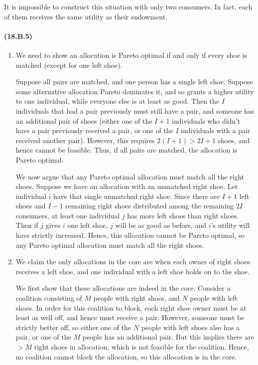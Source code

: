 \documentclass[10pt,letter]{article}
\begin{document}
It is impossible to construct this situation with only two consumers. In fact, each of them receives the same utility as their endowment.
\paragraph{(18.B.5)}
\begin{enumerate}[label=(\alph*)]
  \item We need to show an allocation is Pareto optimal if and only if every shoe is matched (except for one left shoe).

  Suppose all pairs are matched, and one person has a single left shoe. Suppose some alternative allocation Pareto dominates it, and so grants a higher utility to one individual, while everyone else is at least as good. Then the $I$ individuals that had a pair previously must still have a pair, and someone has an additional pair of shoes (either one of the $I+1$ individuals who didn't have a pair previously received a pair, or one of the $I$ individuals with a pair received another pair). However, this requires $2(I+1) > 2I+1$ shoes, and hence cannot be feasible. Thus, if all pairs are matched, the allocation is Pareto optimal.

  We now argue that any Pareto optimal allocation must match all the right shoes. Suppose we have an allocation with an unmatched right shoe. Let individual $i$ have that single unmatched right shoe. Since there are $I + 1$ left shoes and $I-1$ remaining right shoes distributed among the remaining $2I$ consumers, at least one individual $j$ has more left shoes than right shoes. Then if $j$ gives $i$ one left shoe, $j$ will be as good as before, and $i$'s utility will have strictly increased. Hence, this allocation cannot be Pareto optimal, so any Pareto optimal allocation must match all the right shoes.
  \item We claim the only allocations in the core are when each owner of right shoes receives a left shoe, and one individual with a left shoe holds on to the shoe.

  We first show that these allocations are indeed in the core. Consider a coalition consisting of $M$ people with right shoes, and $N$ people with left shoes. In order for this coalition to block, each right shoe owner must be at least as well off, and hence must receive a pair. However, someone must be strictly better off, so either one of the $N$ people with left shoes also has a pair, or one of the $M$ people has an additional pair. But this implies there are $> M$ right shoes in allocation, which is not feasible for the coalition. Hence, no coalition cannot block the allocation, so this allocation is in the core.


\end{enumerate}
\end{document}
